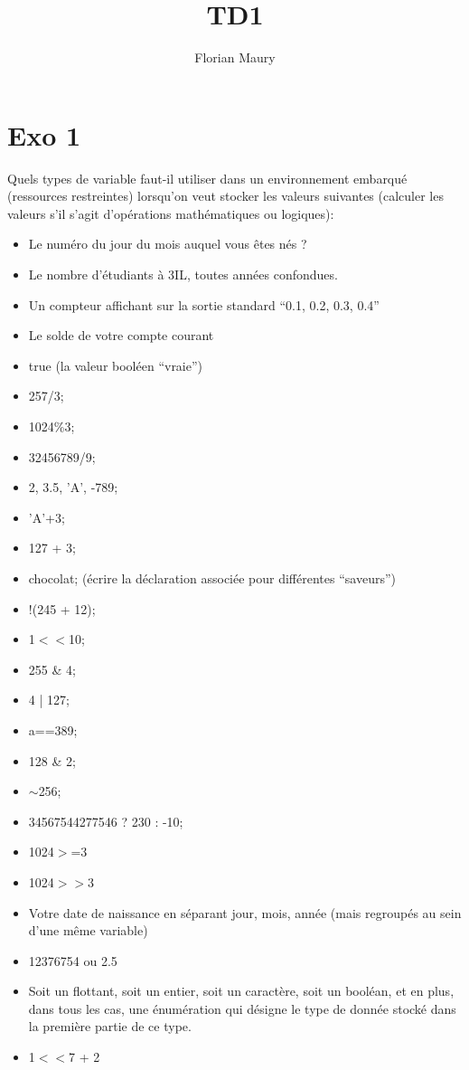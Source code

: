 \documentclass[10pt,twocolumn]{article}
\title{TD1}
\author{Florian Maury}
\begin{document}
\maketitle

\section{Exo 1}
Quels types de variable faut-il utiliser dans un environnement embarqu\'e (ressources restreintes) lorsqu'on veut stocker les valeurs suivantes (calculer les valeurs s'il s'agit d'op\'erations math\'ematiques ou logiques):
\begin{itemize}
	  \item Le num\'ero du jour du mois auquel vous \^etes n\'es ? 
	  \item Le nombre d'\'etudiants \`a 3IL, toutes ann\'ees confondues. 
	  \item Un compteur affichant sur la sortie standard ``0.1, 0.2, 0.3, 0.4''
	  \item Le solde de votre compte courant
	  \item true (la valeur bool\'een ``vraie'')
	  \item 257/3;
	  \item 1024\%3;
	  \item 32456789/9;
	  \item {2, 3.5, 'A', -789}; 
	  \item 'A'+3;
	  \item 127 + 3;
	  \item chocolat; (\'ecrire la d\'eclaration associ\'ee pour diff\'erentes ``saveurs'')
	  \item !(245 + 12);
	  \item 1$<<$10;
	  \item	255 \& 4;
	  \item 4 | 127;
	  \item a==389;
	  \item 128 \& 2; 
	  \item $\sim$256;
	  \item 34567544277546 ? 230 : -10;
	  \item	1024$>$=3
	  \item 1024$>>$3
	  \item	Votre date de naissance en s\'eparant jour, mois, ann\'ee (mais regroup\'es au sein d'une m\^eme variable)
	  \item 12376754 ou 2.5
	  \item	Soit un flottant, soit un entier, soit un caract\`ere, soit un bool\'ean, et en plus, dans tous les cas, une \'enum\'eration qui d\'esigne le type de donn\'ee stock\'e dans la premi\`ere partie de ce type.
	  \item	1$<<$7 + 2
\end{itemize}
\end{document}
